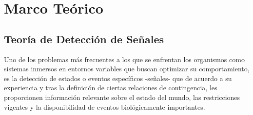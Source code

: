\chapter{Marco Teórico} %

\label{Cap_SDT} %


\newcommand{\keyword}[1]{\textbf{#1}}
\newcommand{\tabhead}[1]{\textbf{#1}}
\newcommand{\code}[1]{\texttt{#1}}
\newcommand{\file}[1]{\texttt{\bfseries#1}}
\newcommand{\option}[1]{\texttt{\itshape#1}}


\section{Teoría de Detección de Señales}

Uno de los problemas más frecuentes a los que se enfrentan los organismos como sistemas inmersos en entornos variables que buscan optimizar su comportamiento, es la detección de estados o eventos específicos -señales- que de acuerdo a su experiencia y tras la definición de ciertas relaciones de contingencia, les proporcionen información relevante sobre el estado del mundo, las restricciones vigentes y la disponibilidad de eventos biológicamente importantes.\\

